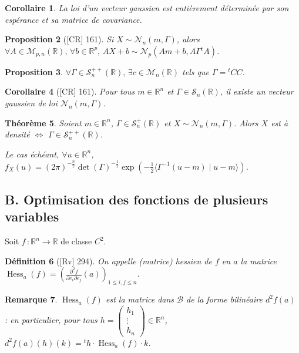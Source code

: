 \documentclass[10pt, a4paper, parskip=full, twoside, twocolumn]{report}
\newtheorem{definition}{Définition}
\newtheorem{theorem}[definition]{Théorème}
\newtheorem{proposition}[definition]{Proposition}
\newtheorem{corollary}[definition]{Corollaire}
\newtheorem{remark}[definition]{Remarque}
\newcommand{\IR}{\mathbb{R}}
\newcommand{\M}{\mathcal{M}}
\newcommand{\B}{\mathcal{B}}
\DeclareMathOperator{\Hess}{Hess}
\begin{document}
\begin{corollary}
	La loi d'un vecteur gaussien est entièrement déterminée par son espérance et sa matrice de covariance.
\end{corollary}

\begin{proposition}[\textnormal{[CR] 161}]
	Si $X\sim \mathcal{N}_n(m,\Gamma)$, alors $\forall A\in\M_{p,n}(\IR),\,\forall b\in\IR^p,\, AX+b\sim \mathcal{N}_p(Am+b, A\Gamma {}^tA)$.
\end{proposition}

\begin{proposition}
	$\forall\Gamma\in \mathcal{S}_n^{++}(\IR),\,\exists c\in\M_n(\IR)$ tels que $\Gamma = {}^tCC$.
\end{proposition}

\begin{corollary}[\textnormal{[CR] 161}]
	Pour tous $m\in\IR^n$ et $\Gamma\in\mathcal{S}_n(\IR)$, il existe un vecteur gaussien de loi $\mathcal{N}_n(m,\Gamma)$.
\end{corollary}

\begin{theorem}
	Soient $m\in\IR^n$, $\Gamma\in\mathcal{S}_n^+(\IR)$ et $X\sim\mathcal{N}_n(m,\Gamma)$.
	Alors $X$ est à densité $\iff$ $\Gamma\in\mathcal{S}_n^{++}(\IR)$.
	
	Le cas échéant, $\forall u\in \IR^n$, $f_X(u) = \left(2\pi\right)^{-\frac{n}{2}}\det(\Gamma)^{-\frac{1}{2}}\exp\left(-\frac{1}{2}\langle\Gamma^{-1}(u-m)\mid u-m\rangle\right)$.
\end{theorem}

\subsection*{B. Optimisation des fonctions de plusieurs variables}

\textcolor{paragraphtext}{Soit $f\,\colon \IR^n\to \IR$ de classe $C^2$.}

\begin{definition}[\textnormal{[Rv] 294}]
	On appelle \emph{(matrice) hessien de $f$ en $a$} la matrice $\Hess_a(f) = \left(\frac{\partial^2 f}{\partial e_i\partial e_j}(a)\right)_{1\leq i,j\leq n}$.
\end{definition}

\begin{remark}
	$\Hess_a(f)$ est la matrice dans $\B$ de la forme bilinéaire $d^2f(a)$ : en particulier, pour tous $h = \begin{pmatrix}
		h_1 \\ \vdots \\ h_n
	\end{pmatrix}\in \IR^n$, $d^2f(a)(h)(k) = {}^th\cdot\Hess_a(f)\cdot k$.
\end{remark}
\end{document}
